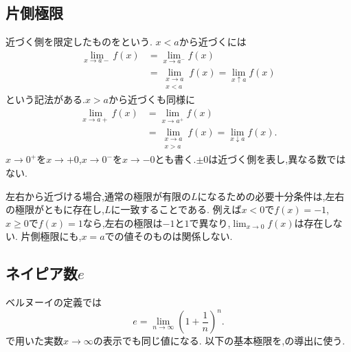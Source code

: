 \subsection{片側極限}\label{節：片側極限}
近づく側を限定したものを\textbf{}という.
$x<a$から近づく\textbf{}には
\[
  \begin{aligned}
    \lim_{x\to a-}f(x)&=\lim_{x\to a^-}f(x)\\
    &=\lim_{\substack{x\to a\\x<a}}f(x)=\lim_{x\uparrow a}f(x)
  \end{aligned}
\]
という記法がある.$x>a$から近づく\textbf{}も同様に
\[
  \begin{aligned}
    \lim_{x\to a+}f(x)&=\lim_{x\to a^+}f(x)\\
    &=\lim_{\substack{x\to a\\x>a}}f(x)=\lim_{x\downarrow a}f(x).
  \end{aligned}
\]
$x\to0^+$を$x\to+0$,$x\to0^-$を$x\to-0$とも書く.$\pm0$は近づく側を表し,異なる数ではない.

左右から近づける場合,通常の極限が有限の$L$になるための必要十分条件は,左右の極限がともに存在し,$L$に一致することである.
例えば$x<0$で$f(x)=-1$,$x\ge0$で$f(x)=1$なら,左右の極限は$-1$と$1$で異なり,$\lim_{x\to0}f(x)$は存在しない.
片側極限にも,$x=a$での値そのものは関係しない.

\subsection{\texorpdfstring{ネイピア数$e$}{ネイピア数e}}\label{節：ネイピア数e}
ベルヌーイの定義では
\[
  e=\lim_{n\to\infty}\left(1+\frac1n\right)^n.
\]
で用いた実数$x\to\infty$の表示でも同じ値になる.
以下の基本極限を,の導出に使う.


